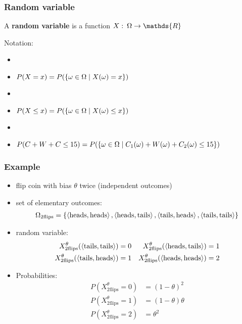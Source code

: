 \documentclass[fleqn,10pt,serif,xcolor=svgnames,xcolor=table,aspectratio=169,handout]{beamer}
\renewcommand{\markdef}[1]{\textcolor{themecolor}{\textbf{#1}}}
\begin{document}
\begin{frame}
  \frametitle{Random variable}

  A \markdef{random variable} is a function $X \mycolon \Omega \rightarrow \mathds{R}$

  \bigskip
  \bigskip \pause

  Notation:\\

  \begin{itemize}
    \item[]
    \item $P(X = x) = P(\left\{\omega \in \Omega \mid X(\omega) = x\right\})$\\ \pause
    \item[]
    \item $P(X \le x) = P(\left\{\omega \in \Omega \mid X(\omega) \le x\right\})$\\ \pause
    \item[]
    \item $P(C + W + C  \le 15) = P(\left\{\omega \in \Omega \mid C_{1}(\omega) + W(\omega) + C_{2}(\omega) \le 15\right\})$
  \end{itemize}



\end{frame}

\begin{frame}
  \frametitle{Example}

  \begin{itemize}
    \item flip coin with bias $\theta$ twice (independent outcomes)
    \item set of elementary outcomes:
    \begin{align*}
      \Omega_{\text{2flips}} = \left\{\left \langle \text{heads}, \text{heads}\right\rangle, \left \langle \text{heads}, \text{tails}\right\rangle,
      \left \langle \text{tails}, \text{heads}\right\rangle, \left \langle \text{tails}, \text{tails}\right\rangle\right\}
    \end{align*}
    \item random variable:
    \begin{align*}
      X_{\text{2flips}}^{\theta}(\left \langle \text{tails}, \text{tails}\right\rangle) & = 0 & X_{\text{2flips}}^{\theta}(\left \langle \text{heads}, \text{tails}\right\rangle) & = 1 \\
      X_{\text{2flips}}^{\theta}(\left \langle \text{tails}, \text{heads}\right\rangle) & = 1 &
      X_{\text{2flips}}^{\theta}(\left \langle \text{heads}, \text{heads}\right\rangle) & = 2
    \end{align*}
    \item Probabilities:
    \begin{align*}
      P(X_{\text{2flips}}^{\theta} = 0) & = (1-\theta)^{2} \\
      P(X_{\text{2flips}}^{\theta} = 1) & = (1-\theta) \theta \\
      P(X_{\text{2flips}}^{\theta} = 2) & = \theta^{2} \\
    \end{align*}
  \end{itemize}

\end{frame}
\end{document}
